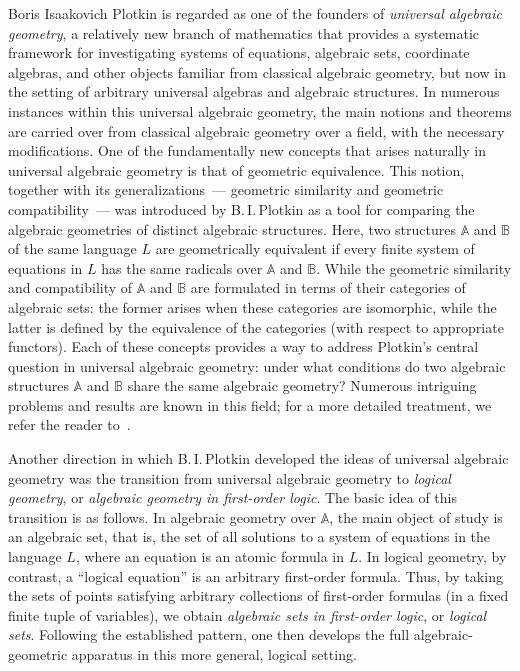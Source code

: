 \documentclass[12pt]{article}
\theoremstyle{definition}
\def\MA{{\mathbb{A}}}
\def\MB{{\mathbb{B}}}
\begin{document}
Boris Isaakovich Plotkin is regarded as one of the founders of {\em universal algebraic geometry}, a relatively new branch of mathematics that provides a systematic framework for investigating systems of equations, algebraic sets, coordinate algebras, and other objects familiar from classical algebraic geometry, but now in the setting of arbitrary universal algebras and algebraic structures. In numerous instances within this universal algebraic geometry, the main notions and theorems are carried over from classical algebraic geometry over a field, with the necessary modifications. One of the fundamentally new concepts that arises naturally in universal algebraic geometry is that of geometric equivalence. This notion, together with its generalizations~--- geometric similarity and geometric compatibility~--- was introduced by B.\,I.\,Plotkin as a tool for comparing the algebraic geometries of distinct algebraic structures. Here, two structures $\MA$ and $\MB$ of the same language $L$ are geometrically equivalent if every finite system of equations in $L$ has the same radicals over $\MA$ and $\MB$.  While the geometric similarity and compatibility of $\MA$ and $\MB$ are formulated in terms of their categories of algebraic sets: the former arises when these categories are isomorphic, while the latter is defined by the equivalence of the categories (with respect to appropriate functors). Each of these concepts provides a way to address Plotkin’s central question in universal algebraic geometry: under what conditions do two algebraic structures $\MA$ and $\MB$ share the same algebraic geometry? Numerous intriguing problems and results are known in this field; for a more detailed treatment, we refer the reader to~\cite{Plotkin4}.

Another direction in which B.\,I.\,Plotkin developed the ideas of universal algebraic geometry was the transition from universal algebraic geometry to {\em logical geometry}, or {\em algebraic geometry in first-order logic}. The basic idea of this transition is as follows. In algebraic geometry over $\MA$, the main object of study is an algebraic set, that is, the set of all solutions to a system of equations in the language $L$, where an equation is an atomic formula in $L$. In logical geometry, by contrast, a ``logical equation'' is an arbitrary first-order formula. Thus, by taking the sets of points satisfying arbitrary collections of first-order formulas (in a fixed finite tuple of variables), we obtain {\em algebraic sets in first-order logic}, or {\em logical sets}. Following the established pattern, one then develops the full algebraic-geometric apparatus in this more general, logical setting.
\end{document}
